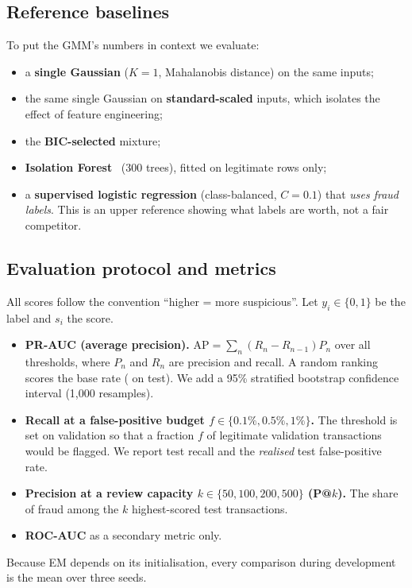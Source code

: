 \documentclass[12pt]{article}
\begin{document}
\subsection{Reference baselines}
To put the GMM's numbers in context we evaluate:
\begin{itemize}
\item a \textbf{single Gaussian} ($K=1$, Mahalanobis distance) on the same inputs;
\item the same single Gaussian on \textbf{standard-scaled} inputs, which isolates the effect of feature engineering;
\item the \textbf{BIC-selected} mixture;
\item \textbf{Isolation Forest}~\cite{liu2008} (300 trees), fitted on legitimate rows only;
\item a \textbf{supervised logistic regression} (class-balanced, $C=0.1$) that \emph{uses fraud labels}. This is an
upper reference showing what labels are worth, not a fair competitor.
\end{itemize}

\subsection{Evaluation protocol and metrics}\label{sec:metrics}
All scores follow the convention ``higher = more suspicious''. Let $y_i\in\{0,1\}$ be the label and $s_i$ the score.
\begin{itemize}
\item \textbf{PR-AUC (average precision).} $\text{AP}=\sum_n (R_n-R_{n-1})P_n$ over all thresholds, where $P_n$ and
$R_n$ are precision and recall. A random ranking scores the base rate (\testRate{} on test). We add a 95\% stratified
bootstrap confidence interval (1{,}000 resamples).
\item \textbf{Recall at a false-positive budget $f\in\{0.1\%,0.5\%,1\%\}$.} The threshold is set on validation so
that a fraction $f$ of legitimate validation transactions would be flagged. We report test recall and the
\emph{realised} test false-positive rate.
\item \textbf{Precision at a review capacity $k\in\{50,100,200,500\}$ (P@$k$).} The share of fraud among the $k$
highest-scored test transactions.
\item \textbf{ROC-AUC} as a secondary metric only.
\end{itemize}
Because EM depends on its initialisation, every comparison during development is the mean over three seeds.
\end{document}
